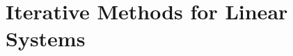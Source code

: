 \documentclass[twoside,a4paper]{book}
\theoremstyle{definition}
\begin{document}
\pagestyle{fancy}
\fancyhead{}


\chapter{Iterative Methods for Linear Systems}
\begin{multicols}{2}
  \setlength{\columnseprule}{0.2pt}
  
  
  
  


\end{multicols}
\end{document}
